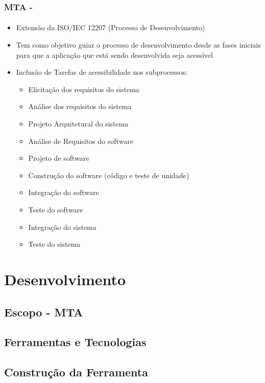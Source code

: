 \documentclass{beamer}
\begin{document}
\begin{frame}
\frametitle{MTA - \citet{maia:10}}
\framesubtitle{}

\begin{itemize}
  \item Extensão da ISO/IEC 12207 (Processo de Desenvolvimento)
  \item Tem como objetivo guiar o processo de desenvolvimento desde as fases iniciais para que a aplicação que está sendo desenvolvida seja acessível
  \item Inclusão de Tarefas de acessibilidade nos subprocessos:
  	\begin{multicols}{2}
  	\begin{itemize}
  	 	\item Elicitação dos requisitos do sistema
  	 	\item Análise dos requisitos do sistema
  	 	\item Projeto Arquitetural do sistema
  	 	\item Análise de Requisitos do software
  	 	\item Projeto de software
  	 	\item Construção do software (código e teste de unidade)
  	 	\item Integração do software
  	 	\item Teste do software
  	 	\item Integração do sistema
  	 	\item Teste do sistema
  	 \end{itemize}
  	\end{multicols}  
\end{itemize}

\end{frame}

\section{Desenvolvimento}

\subsection[Escopo - MTA]{Escopo - MTA}

\subsection[Ferramentas e Tecnologias]{Ferramentas e Tecnologias}

\subsection[Construção da Ferramenta]{Construção da Ferramenta}
\end{document}
